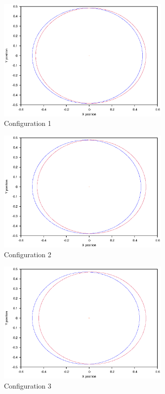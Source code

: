 \documentclass[a4paper,12pt]{article}
\begin{document}
\begin{figure}[H]
\centering
\includegraphics[width=0.75\textwidth]{./results/002-5-001/Orbit.eps}
\caption{Configuration 1}
\label{fig:config1}
\end{figure}
\begin{figure}[H]
\centering
\includegraphics[width=0.75\textwidth]{./results/003-5-001/Orbit.eps}
\caption{Configuration 2}
\label{fig:config2}
\end{figure}
\begin{figure}[H]
\centering
\includegraphics[width=0.75\textwidth]{./results/004-5-004/Orbit.eps}
\caption{Configuration 3}
\label{fig:config3}
\end{figure}
\end{document}
